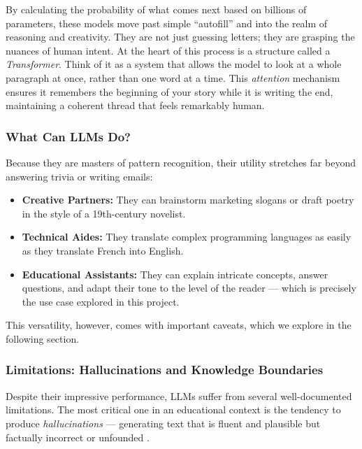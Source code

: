 \documentclass[a4paper,11pt]{article}
\begin{document}
By calculating the probability of what comes next based on billions of
parameters, these models move past simple ``autofill'' and into the realm
of reasoning and creativity. They are not just guessing letters; they are
grasping the nuances of human intent. At the heart of this process is a
structure called a \emph{Transformer}. Think of it as a system that allows
the model to look at a whole paragraph at once, rather than one word at a
time. This \emph{attention} mechanism ensures it remembers the beginning of
your story while it is writing the end, maintaining a coherent thread that
feels remarkably human.

\subsubsection{What Can LLMs Do?}

Because they are masters of pattern recognition, their utility stretches
far beyond answering trivia or writing emails:

\begin{itemize}
  \item \textbf{Creative Partners:} They can brainstorm marketing slogans
    or draft poetry in the style of a 19th-century novelist.
  \item \textbf{Technical Aides:} They translate complex programming
    languages as easily as they translate French into English.
  \item \textbf{Educational Assistants:} They can explain intricate
    concepts, answer questions, and adapt their tone to the level of the
    reader --- which is precisely the use case explored in this project.
\end{itemize}

This versatility, however, comes with important caveats, which we explore
in the following section.

\subsubsection{Limitations: Hallucinations and Knowledge Boundaries}

Despite their impressive performance, LLMs suffer from several
well-documented limitations. The most critical one in an educational context
is the tendency to produce \emph{hallucinations} --- generating text that is
fluent and plausible but factually incorrect or unfounded
\cite{zhang2023hallucination, huang2025hallucination, llm_hallucinations_medium}.
\end{document}
